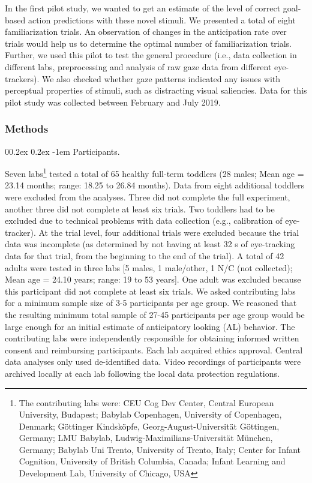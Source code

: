 \documentclass[
  english,
  man, donotrepeattitle,floatsintext]{apa6}
\makeatletter
\let\oldparagraph\paragraph
\renewcommand{\paragraph}[1]{\oldparagraph{#1}\mbox{}}
\renewcommand{\paragraph}{\@startsection{paragraph}{4}{\parindent}%
  {0\baselineskip \@plus 0.2ex \@minus 0.2ex}%
  {-1em}%
  {\normalfont\normalsize\bfseries\itshape\typesectitle}}
\makeatother
\begin{document}
In the first pilot study, we wanted to get an estimate of the level of correct goal-based action predictions with these novel stimuli. We presented a total of eight familiarization trials. An observation of changes in the anticipation rate over trials would help us to determine the optimal number of familiarization trials. Further, we used this pilot to test the general procedure (i.e., data collection in different labs, preprocessing and analysis of raw gaze data from different eye-trackers). We also checked whether gaze patterns indicated any issues with perceptual properties of stimuli, such as distracting visual saliencies. Data for this pilot study was collected between February and July 2019.

\hypertarget{methods}{%
\subsubsection{Methods}\label{methods}}

\hypertarget{participants.}{%
\paragraph{Participants.}\label{participants.}}

Seven labs\footnote{The contributing labs were: CEU Cog Dev Center, Central European University, Budapest; Babylab Copenhagen, University of Copenhagen, Denmark; Göttinger Kindsköpfe, Georg-August-Universität Göttingen, Germany; LMU Babylab, Ludwig-Maximilians-Universität München, Germany; Babylab Uni Trento, University of Trento, Italy; Center for Infant Cognition, University of British Columbia, Canada; Infant Learning and Development Lab, University of Chicago, USA} tested a total of 65 healthy full-term toddlers (28 males; Mean age = 23.14 months; range: 18.25 to 26.84 months). Data from eight additional toddlers were excluded from the analyses. Three did not complete the full experiment, another three did not complete at least six trials. Two toddlers had to be excluded due to technical problems with data collection (e.g., calibration of eye-tracker). At the trial level, four additional trials were excluded because the trial data was incomplete (as determined by not having at least 32 s of eye-tracking data for that trial, from the beginning to the end of the trial). A total of 42 adults were tested in three labs {[}5 males, 1 male/other, 1 N/C (not collected); Mean age = 24.10 years; range: 19 to 53 years{]}. One adult was excluded because this participant did not complete at least six trials. We asked contributing labs for a minimum sample size of 3-5 participants per age group. We reasoned that the resulting minimum total sample of 27-45 participants per age group would be large enough for an initial estimate of anticipatory looking (AL) behavior. The contributing labs were independently responsible for obtaining informed written consent and reimbursing participants. Each lab acquired ethics approval. Central data analyses only used de-identified data. Video recordings of participants were archived locally at each lab following the local data protection regulations.
\end{document}
